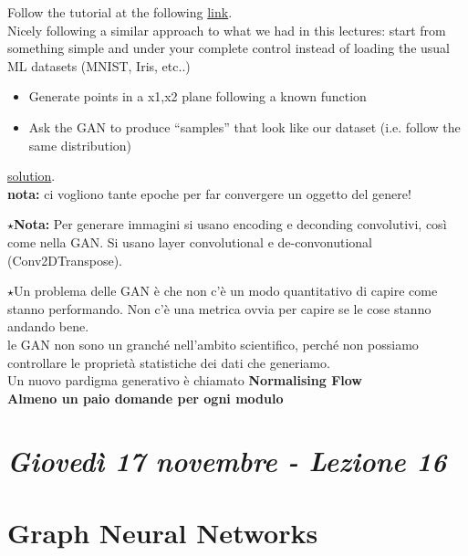 Follow the tutorial at the following \href{https://machinelearningmastery.com/how-to-develop-a-generative-adversarial-network-for-a-1-dimensional-function-from-scratch-in-keras/}{link}.\\

Nicely following a similar approach to what we had in this lectures: start from something simple and under your complete control instead of loading the usual ML datasets (MNIST, Iris, etc..)

\begin{itemize}
	\item Generate points in a x1,x2 plane following a known function
	\item Ask the GAN to produce “samples” that look like our dataset (i.e. follow the same distribution)
\end{itemize}

\href{https://colab.research.google.com/drive/17Ad1AjATCVbkMaSInfTmryZYK52qLRox#scrollTo=Y7Yhi844aP2Y&uniqifier=1}{solution}.\\


\textbf{nota:} ci vogliono tante epoche per far convergere un oggetto del genere!


$\star$\textbf{Nota:} Per generare immagini si usano encoding e deconding convolutivi, così come nella GAN. Si usano layer convolutional e de-convonutional (Conv2DTranspose).

$\star$Un problema delle GAN è che non c'è un modo quantitativo di capire come stanno performando. Non c'è una metrica ovvia per capire se le cose stanno andando bene.\\


le GAN non sono un granché nell'ambito scientifico, perché non possiamo controllare le proprietà statistiche dei dati che generiamo.\\

Un nuovo pardigma generativo è chiamato \textbf{Normalising Flow}\\


\textbf{Almeno un paio domande per ogni modulo}

\newpage

\section{\textit{Giovedì 17 novembre - Lezione 16}}
\section{Graph Neural Networks}


